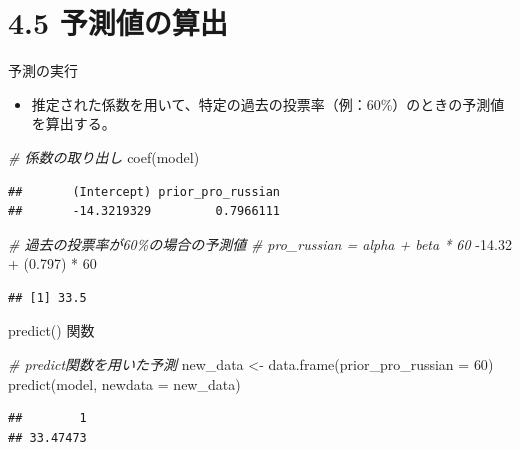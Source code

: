 \documentclass[
  ignorenonframetext,
]{beamer}
\newenvironment{Shaded}{\begin{snugshade}}{\end{snugshade}}
\newcommand{\AttributeTok}[1]{\textcolor[rgb]{0.77,0.63,0.00}{#1}}
\newcommand{\CommentTok}[1]{\textcolor[rgb]{0.56,0.35,0.01}{\textit{#1}}}
\newcommand{\DecValTok}[1]{\textcolor[rgb]{0.00,0.00,0.81}{#1}}
\newcommand{\FloatTok}[1]{\textcolor[rgb]{0.00,0.00,0.81}{#1}}
\newcommand{\FunctionTok}[1]{\textcolor[rgb]{0.00,0.00,0.00}{#1}}
\newcommand{\NormalTok}[1]{#1}
\newcommand{\OtherTok}[1]{\textcolor[rgb]{0.56,0.35,0.01}{#1}}
\newcommand{\SpecialCharTok}[1]{\textcolor[rgb]{0.00,0.00,0.00}{#1}}
\providecommand{\tightlist}{%
  \setlength{\itemsep}{0pt}\setlength{\parskip}{0pt}}
\begin{document}
\hypertarget{ux4e88ux6e2cux5024ux306eux7b97ux51fa}{%
\section{4.5 予測値の算出}\label{ux4e88ux6e2cux5024ux306eux7b97ux51fa}}

\begin{frame}[fragile]{予測の実行}
\protect\hypertarget{ux4e88ux6e2cux306eux5b9fux884c}{}
\begin{itemize}
\tightlist
\item
  推定された係数を用いて、特定の過去の投票率（例：60\%）のときの予測値を算出する。
\end{itemize}

\begin{Shaded}
\begin{Highlighting}[]
\CommentTok{\# 係数の取り出し}
\FunctionTok{coef}\NormalTok{(model)}
\end{Highlighting}
\end{Shaded}

\begin{verbatim}
##       (Intercept) prior_pro_russian 
##       -14.3219329         0.7966111
\end{verbatim}

\begin{Shaded}
\begin{Highlighting}[]
\CommentTok{\# 過去の投票率が60\%の場合の予測値}
\CommentTok{\# pro\_russian = alpha + beta * 60}
\SpecialCharTok{{-}}\FloatTok{14.32} \SpecialCharTok{+}\NormalTok{ (}\FloatTok{0.797}\NormalTok{) }\SpecialCharTok{*} \DecValTok{60}
\end{Highlighting}
\end{Shaded}

\begin{verbatim}
## [1] 33.5
\end{verbatim}
\end{frame}

\begin{frame}[fragile]{predict() 関数}
\protect\hypertarget{predict-ux95a2ux6570}{}
\begin{Shaded}
\begin{Highlighting}[]
\CommentTok{\# predict関数を用いた予測}
\NormalTok{new\_data }\OtherTok{\textless{}{-}} \FunctionTok{data.frame}\NormalTok{(}\AttributeTok{prior\_pro\_russian =} \DecValTok{60}\NormalTok{)}
\FunctionTok{predict}\NormalTok{(model, }\AttributeTok{newdata =}\NormalTok{ new\_data)}
\end{Highlighting}
\end{Shaded}

\begin{verbatim}
##        1 
## 33.47473
\end{verbatim}
\end{frame}
\end{document}
